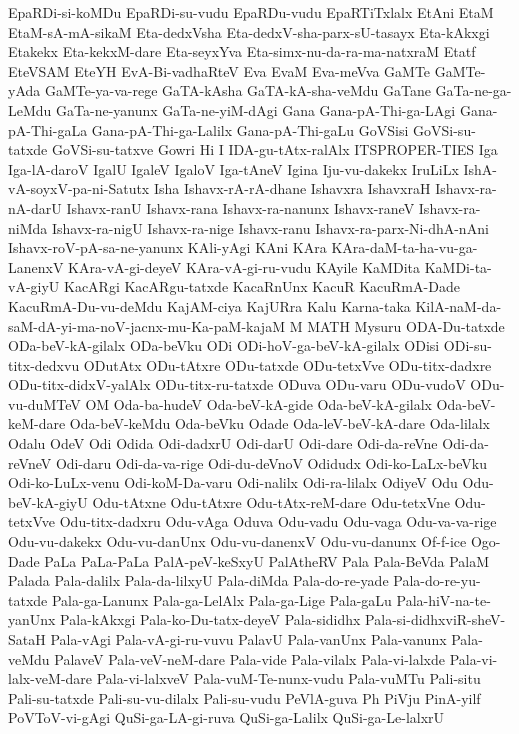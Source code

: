 {EpaRDi-si-koMDu
EpaRDi-su-vudu
EpaRDu-vudu
EpaRTiTxlalx
EtAni
EtaM
EtaM-sA-mA-sikaM
Eta-dedxVsha
Eta-dedxV-sha-parx-sU-tasayx
Eta-kAkxgi
Etakekx
Eta-kekxM-dare
Eta-seyxYva
Eta-simx-nu-da-ra-ma-natxraM
Etatf
EteVSAM
EteYH
EvA-Bi-vadhaRteV
Eva
EvaM
Eva-meVva
GaMTe
GaMTe-yAda
GaMTe-ya-va-rege
GaTA-kAsha
GaTA-kA-sha-veMdu
GaTane
GaTa-ne-ga-LeMdu
GaTa-ne-yanunx
GaTa-ne-yiM-dAgi
Gana
Gana-pA-Thi-ga-LAgi
Gana-pA-Thi-gaLa
Gana-pA-Thi-ga-Lalilx
Gana-pA-Thi-gaLu
GoVSisi
GoVSi-su-tatxde
GoVSi-su-tatxve
Gowri
Hi
I
IDA-gu-tAtx-ralAlx
ITSPROPER-TIES
Iga
Iga-lA-daroV
IgalU
IgaleV
IgaloV
Iga-tAneV
Igina
Iju-vu-dakekx
IruLiLx
IshA-vA-soyxV-pa-ni-Satutx
Isha
Ishavx-rA-rA-dhane
Ishavxra
IshavxraH
Ishavx-ra-nA-darU
Ishavx-ranU
Ishavx-rana
Ishavx-ra-nanunx
Ishavx-raneV
Ishavx-ra-niMda
Ishavx-ra-nigU
Ishavx-ra-nige
Ishavx-ranu
Ishavx-ra-parx-Ni-dhA-nAni
Ishavx-roV-pA-sa-ne-yanunx
KAli-yAgi
KAni
KAra
KAra-daM-ta-ha-vu-ga-LanenxV
KAra-vA-gi-deyeV
KAra-vA-gi-ru-vudu
KAyile
KaMDita
KaMDi-ta-vA-giyU
KacARgi
KacARgu-tatxde
KacaRnUnx
KacuR
KacuRmA-Dade
KacuRmA-Du-vu-deMdu
KajAM-ciya
KajURra
Kalu
Karna-taka
KilA-naM-da-saM-dA-yi-ma-noV-jacnx-mu-Ka-paM-kajaM
M
MATH
Mysuru
ODA-Du-tatxde
ODa-beV-kA-gilalx
ODa-beVku
ODi
ODi-hoV-ga-beV-kA-gilalx
ODisi
ODi-su-titx-dedxvu
ODutAtx
ODu-tAtxre
ODu-tatxde
ODu-tetxVve
ODu-titx-dadxre
ODu-titx-didxV-yalAlx
ODu-titx-ru-tatxde
ODuva
ODu-varu
ODu-vudoV
ODu-vu-duMTeV
OM
Oda-ba-hudeV
Oda-beV-kA-gide
Oda-beV-kA-gilalx
Oda-beV-keM-dare
Oda-beV-keMdu
Oda-beVku
Odade
Oda-leV-beV-kA-dare
Oda-lilalx
Odalu
OdeV
Odi
Odida
Odi-dadxrU
Odi-darU
Odi-dare
Odi-da-reVne
Odi-da-reVneV
Odi-daru
Odi-da-va-rige
Odi-du-deVnoV
Odidudx
Odi-ko-LaLx-beVku
Odi-ko-LuLx-venu
Odi-koM-Da-varu
Odi-nalilx
Odi-ra-lilalx
OdiyeV
Odu
Odu-beV-kA-giyU
Odu-tAtxne
Odu-tAtxre
Odu-tAtx-reM-dare
Odu-tetxVne
Odu-tetxVve
Odu-titx-dadxru
Odu-vAga
Oduva
Odu-vadu
Odu-vaga
Odu-va-va-rige
Odu-vu-dakekx
Odu-vu-danUnx
Odu-vu-danenxV
Odu-vu-danunx
Of-f-ice
Ogo-Dade
PaLa
PaLa-PaLa
PalA-peV-keSxyU
PalAtheRV
Pala
Pala-BeVda
PalaM
Palada
Pala-dalilx
Pala-da-lilxyU
Pala-diMda
Pala-do-re-yade
Pala-do-re-yu-tatxde
Pala-ga-Lanunx
Pala-ga-LelAlx
Pala-ga-Lige
Pala-gaLu
Pala-hiV-na-te-yanUnx
Pala-kAkxgi
Pala-ko-Du-tatx-deyeV
Pala-sididhx
Pala-si-didhxviR-sheV-SataH
Pala-vAgi
Pala-vA-gi-ru-vuvu
PalavU
Pala-vanUnx
Pala-vanunx
Pala-veMdu
PalaveV
Pala-veV-neM-dare
Pala-vide
Pala-vilalx
Pala-vi-lalxde
Pala-vi-lalx-veM-dare
Pala-vi-lalxveV
Pala-vuM-Te-nunx-vudu
Pala-vuMTu
Pali-situ
Pali-su-tatxde
Pali-su-vu-dilalx
Pali-su-vudu
PeVlA-guva
Ph
PiVju
PinA-yilf
PoVToV-vi-gAgi
QuSi-ga-LA-gi-ruva
QuSi-ga-Lalilx
QuSi-ga-Le-lalxrU
}

